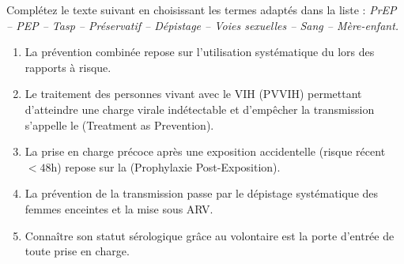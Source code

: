 \documentclass[11pt]{article}
\begin{document}
\begin{exercice}
Complétez le texte suivant en choisissant les termes adaptés dans la liste :
\textit{PrEP -- PEP -- Tasp -- Préservatif -- Dépistage -- Voies sexuelles -- Sang -- Mère-enfant.}
\begin{enumerate}
    \item La prévention combinée repose sur l'utilisation systématique du \underline{\hspace{4cm}} lors des rapports à risque.
    \item Le traitement des personnes vivant avec le VIH (PVVIH) permettant d'atteindre une charge virale indétectable et d'empêcher la transmission s'appelle le \underline{\hspace{4cm}} (Treatment as Prevention).
    \item La prise en charge précoce après une exposition accidentelle (risque récent $< 48$h) repose sur la \underline{\hspace{4cm}} (Prophylaxie Post-Exposition).
    \item La prévention de la transmission \underline{\hspace{4cm}} passe par le dépistage systématique des femmes enceintes et la mise sous ARV.
    \item Connaître son statut sérologique grâce au \underline{\hspace{4cm}} volontaire est la porte d'entrée de toute prise en charge.
\end{enumerate}
\end{exercice}
\end{document}
